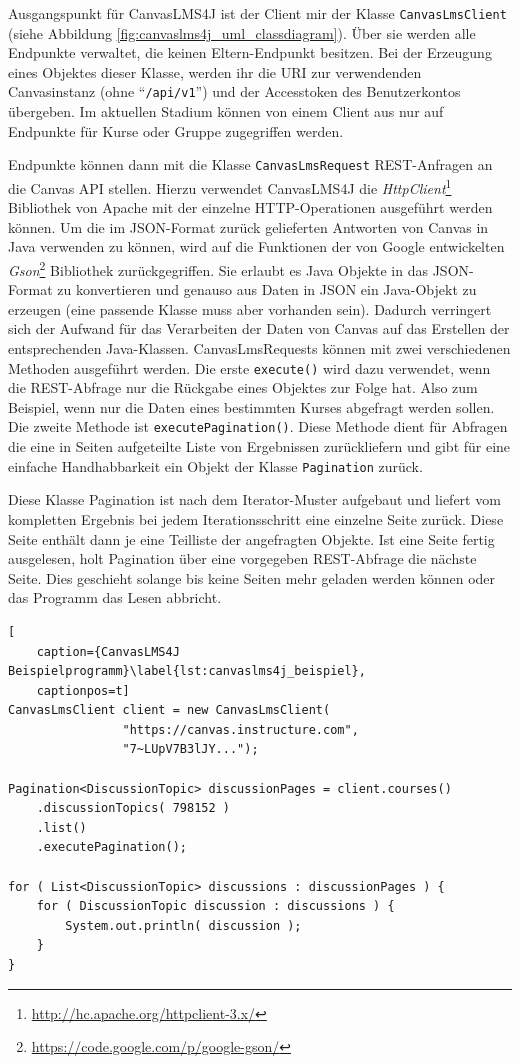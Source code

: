 Ausgangspunkt für CanvasLMS4J ist der Client mir der Klasse \texttt{CanvasLmsClient} (siehe Abbildung \ref{fig:canvaslms4j_uml_classdiagram}). Über sie werden alle Endpunkte verwaltet, die keinen Eltern-Endpunkt besitzen. Bei der Erzeugung eines Objektes dieser Klasse, werden ihr die URI zur verwendenden Canvasinstanz (ohne \enquote{\texttt{/api/v1}}) und der Accesstoken des Benutzerkontos übergeben. Im aktuellen Stadium können von einem Client aus nur auf Endpunkte für Kurse oder Gruppe zugegriffen werden.

Endpunkte können dann mit die Klasse \texttt{CanvasLmsRequest} REST-Anfragen an die Canvas API stellen. Hierzu verwendet CanvasLMS4J die \emph{HttpClient}\footnote{\url{http://hc.apache.org/httpclient-3.x/}} Bibliothek von Apache mit der einzelne HTTP-Operationen ausgeführt werden können. Um die im JSON-Format zurück gelieferten Antworten von Canvas in Java verwenden zu können, wird auf die Funktionen der von Google entwickelten \emph{Gson}\footnote{\url{https://code.google.com/p/google-gson/}} Bibliothek zurückgegriffen. Sie erlaubt es Java Objekte in das JSON-Format zu konvertieren und genauso aus Daten in JSON ein Java-Objekt zu erzeugen (eine passende Klasse muss aber vorhanden sein). Dadurch verringert sich der Aufwand für das Verarbeiten der Daten von Canvas auf das Erstellen der entsprechenden Java-Klassen. CanvasLmsRequests können mit zwei verschiedenen Methoden ausgeführt werden. Die erste \texttt{execute()} wird dazu verwendet, wenn die REST-Abfrage nur die Rückgabe eines Objektes zur Folge hat. Also zum Beispiel, wenn nur die Daten eines bestimmten Kurses abgefragt werden sollen. Die zweite Methode ist \texttt{executePagination()}. Diese Methode dient für Abfragen die eine in Seiten aufgeteilte Liste von Ergebnissen zurückliefern und gibt für eine einfache Handhabbarkeit ein Objekt der Klasse \texttt{Pagination} zurück. 

Diese Klasse Pagination ist nach dem Iterator-Muster aufgebaut und liefert vom kompletten Ergebnis bei jedem Iterationsschritt eine einzelne Seite zurück. Diese Seite enthält dann je eine Teilliste der angefragten Objekte. Ist eine Seite fertig ausgelesen, holt Pagination über eine vorgegeben REST-Abfrage die nächste Seite. Dies geschieht solange bis keine Seiten mehr geladen werden können oder das Programm das Lesen abbricht.

\begin{lstlisting}[
    caption={CanvasLMS4J Beispielprogramm}\label{lst:canvaslms4j_beispiel},
    captionpos=t]
CanvasLmsClient client = new CanvasLmsClient(
                "https://canvas.instructure.com",
                "7~LUpV7B3lJY...");

Pagination<DiscussionTopic> discussionPages = client.courses()
    .discussionTopics( 798152 )
    .list()
    .executePagination();

for ( List<DiscussionTopic> discussions : discussionPages ) {
    for ( DiscussionTopic discussion : discussions ) {
        System.out.println( discussion );
    }
}

\end{lstlisting}

